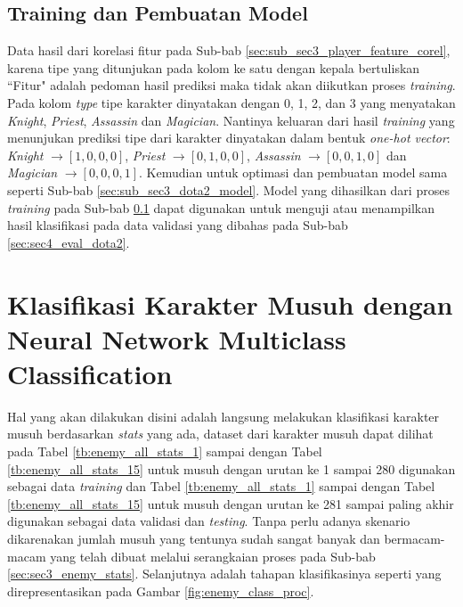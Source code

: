 \subsection{Training dan Pembuatan Model}
\label{sec:sub_sec3_player_char_train}
\vspace{1ex}

Data hasil dari korelasi fitur pada Sub-bab \ref{sec:sub_sec3_player_feature_corel}, karena tipe yang ditunjukan pada kolom ke satu dengan kepala bertuliskan ``Fitur" adalah pedoman hasil prediksi maka tidak akan diikutkan proses \textit{training}. Pada kolom \textit{type} tipe karakter dinyatakan dengan 0, 1, 2, dan 3 yang menyatakan \textit{Knight}, \textit{Priest}, \textit{Assassin} dan \textit{Magician}. Nantinya keluaran dari hasil \textit{training} yang menunjukan prediksi tipe dari karakter dinyatakan dalam bentuk \textit{one-hot vector}: \textit{Knight} $\rightarrow [1, 0, 0, 0]$, \textit{Priest} $\rightarrow [0, 1, 0, 0]$, \textit{Assassin} $\rightarrow [0, 0, 1, 0]$ dan \textit{Magician} $\rightarrow [0, 0, 0, 1]$. Kemudian untuk optimasi dan pembuatan model sama seperti Sub-bab \ref{sec:sub_sec3_dota2_model}. Model yang dihasilkan dari proses \textit{training} pada Sub-bab \ref{sec:sub_sec3_player_char_train} dapat digunakan untuk menguji atau menampilkan hasil klasifikasi pada data validasi yang dibahas pada Sub-bab \ref{sec:sec4_eval_dota2}.
\vspace{1ex}

\section{Klasifikasi Karakter Musuh dengan Neural Network Multiclass Classification}
\label{sec:sec3_enemy_method}
\vspace{1ex}

Hal yang akan dilakukan disini adalah langsung melakukan klasifikasi karakter musuh berdasarkan \textit{stats} yang ada, dataset dari karakter musuh dapat dilihat pada Tabel \ref{tb:enemy_all_stats_1} sampai dengan Tabel \ref{tb:enemy_all_stats_15} untuk musuh dengan urutan ke 1 sampai 280 digunakan sebagai data \textit{training} dan Tabel \ref{tb:enemy_all_stats_1} sampai dengan Tabel \ref{tb:enemy_all_stats_15} untuk musuh dengan urutan ke 281 sampai paling akhir digunakan sebagai data validasi dan \textit{testing}. Tanpa perlu adanya skenario dikarenakan jumlah musuh yang tentunya sudah sangat banyak dan bermacam-macam yang telah dibuat melalui serangkaian proses pada Sub-bab \ref{sec:sec3_enemy_stats}. Selanjutnya adalah tahapan klasifikasinya seperti yang direpresentasikan pada Gambar \ref{fig:enemy_class_proc}.
\vspace{1ex}

